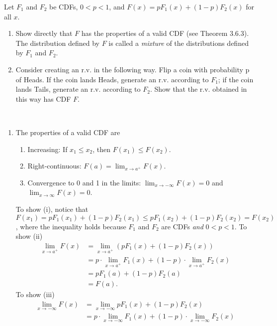 
\setcounter{theorem}{4}
\begin{exercise}[BH.3.9]
  Let $F_1$ and $F_2$ be CDFs, $0 < p < 1$, and $F(x) = p F_1(x)+ (1 - p) F_2(x)$ for all $x$.
	\begin{enumerate}
		\item Show directly that $F$ has the properties of a valid CDF (see Theorem 3.6.3). The distribution defined by $F$ is called a \emph{mixture} of the distributions defined by $F_1$ and $F_2$.
		\item Consider creating an r.v. in the following way. Flip a coin with probability p of Heads. If the coin lands Heads, generate an r.v. according to $F_1$; if the coin lands Tails, generate an r.v. according to $F_2$. Show that the r.v. obtained in this way has CDF $F$.
	\end{enumerate}
\begin{solution}~
	\begin{enumerate}
		\item The properties of a valid CDF are
		\begin{enumerate}
			\item Increasing: If $x_{1}\leq x_{2}$, then $F(x_{1})\leq F(x_{2})$.
			\item Right-continuous: $F(a)=\lim_{x\rightarrow a^{+}} F(x)$.
			\item Convergence to 0 and 1 in the limits: $\lim_{x\rightarrow-\infty}F(x)=0$ and $\lim_{x\rightarrow\infty}F(x)=0$.
		\end{enumerate}
		To show (i), notice that $F(x_{1})= pF_{1}(x_{1}) + (1-p)F_{2}(x_{1})\leq  pF_{1}(x_{2}) + (1-p)F_{2}(x_{2})=F(x_{2})$, where the inequality holds because $F_{1}$ and $F_{2}$ are CDFs \textit{and} $0<p<1$. 
		To show (ii) 
		\begin{align*}
			\lim_{x\rightarrow a^{+}} F(x) &= \lim_{x\rightarrow a^{+}}(pF_1(x) + (1-p)F_{2}(x))\\
			&= p\cdot \lim_{x\rightarrow a^{+}}F_1(x) + (1-p)\cdot \lim_{x\rightarrow a^{+}}F_{2}(x)\tag*{(Algebraic Limit Theorem)}\\
			& = p F_1(a) + (1-p)F_{2}(a)\\
			& = F(a).
		\end{align*}
		To show (iii)
		\begin{align*}
			\lim_{x\rightarrow-\infty}F(x)& = \lim_{x\rightarrow-\infty} pF_1(x) + (1-p)F_{2}(x)\\
			& =p\cdot  \lim_{x\rightarrow-\infty} F_1(x) + (1-p) \cdot  \lim_{x\rightarrow-\infty} F_{2}(x)\\

\end{align*}
\end{enumerate}
\end{solution}
\end{exercise}
